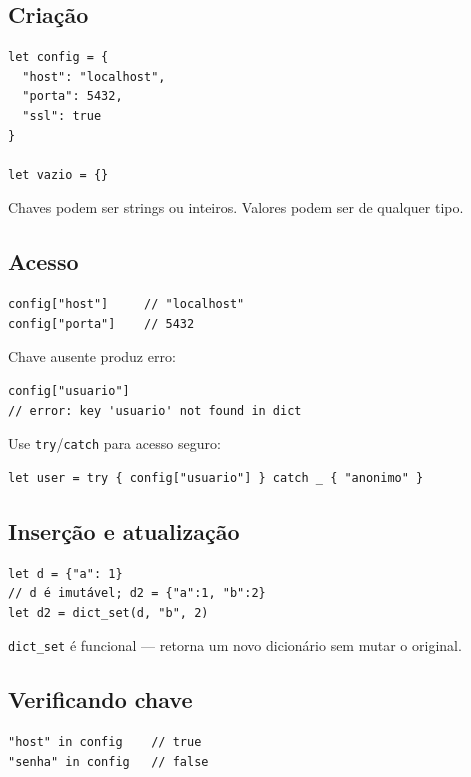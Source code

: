 \subsection{Criação}

\begin{lstlisting}
let config = {
  "host": "localhost",
  "porta": 5432,
  "ssl": true
}

let vazio = {}
\end{lstlisting}

Chaves podem ser strings ou inteiros. Valores podem ser de qualquer tipo.

\subsection{Acesso}

\begin{lstlisting}
config["host"]     // "localhost"
config["porta"]    // 5432
\end{lstlisting}

Chave ausente produz erro:

\begin{lstlisting}
config["usuario"]
// error: key 'usuario' not found in dict
\end{lstlisting}

Use \lstinline{try}/\lstinline{catch} para acesso seguro:

\begin{lstlisting}
let user = try { config["usuario"] } catch _ { "anonimo" }
\end{lstlisting}

\subsection{Inserção e atualização}

\begin{lstlisting}
let d = {"a": 1}
// d é imutável; d2 = {"a":1, "b":2}
let d2 = dict_set(d, "b", 2)
\end{lstlisting}

\lstinline{dict_set} é funcional — retorna um novo dicionário sem mutar o original.

\subsection{Verificando chave}

\begin{lstlisting}
"host" in config    // true
"senha" in config   // false
\end{lstlisting}

